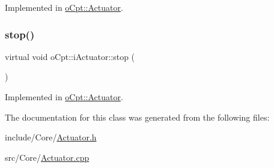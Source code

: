 Implemented in \hyperlink{classo_cpt_1_1_actuator_a3a3813e5730f0257e74de7300eeeffa1}{o\+Cpt\+::\+Actuator}.

\hypertarget{classo_cpt_1_1i_actuator_ae3f9fbb61d920bee1bd297fb5a89625e}{}\label{classo_cpt_1_1i_actuator_ae3f9fbb61d920bee1bd297fb5a89625e} 
\subsubsection{\texorpdfstring{stop()}{stop()}}
{\footnotesize\ttfamily virtual void o\+Cpt\+::i\+Actuator\+::stop (\begin{DoxyParamCaption}{ }\end{DoxyParamCaption})\hspace{0.3cm}{\ttfamily [pure virtual]}}



Implemented in \hyperlink{classo_cpt_1_1_actuator_aa41132ff134e8b067353459dedbb0f37}{o\+Cpt\+::\+Actuator}.



The documentation for this class was generated from the following files\+:\begin{DoxyCompactItemize}
\item 
include/\+Core/\hyperlink{_actuator_8h}{Actuator.\+h}\item 
src/\+Core/\hyperlink{_actuator_8cpp}{Actuator.\+cpp}\end{DoxyCompactItemize}
